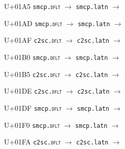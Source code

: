 \documentclass{article}
\begin{document}
\begin{substitutions}
\goodbreak

U+01A5  \linebreak
    \texttt{smcp.\textsc{dflt}} $\to$  \linebreak
    \texttt{smcp.latn} $\to$  

\goodbreak

U+01AD  \linebreak
    \texttt{smcp.\textsc{dflt}} $\to$  \linebreak
    \texttt{smcp.latn} $\to$  

\goodbreak

U+01AF  \linebreak
    \texttt{c2sc.\textsc{dflt}} $\to$  \linebreak
    \texttt{c2sc.latn} $\to$  

\goodbreak

U+01B0  \linebreak
    \texttt{smcp.\textsc{dflt}} $\to$  \linebreak
    \texttt{smcp.latn} $\to$  

\goodbreak

U+01B5  \linebreak
    \texttt{c2sc.\textsc{dflt}} $\to$  \linebreak
    \texttt{c2sc.latn} $\to$  

\goodbreak

U+01DE  \linebreak
    \texttt{c2sc.\textsc{dflt}} $\to$  \linebreak
    \texttt{c2sc.latn} $\to$  

\goodbreak

U+01DF  \linebreak
    \texttt{smcp.\textsc{dflt}} $\to$  \linebreak
    \texttt{smcp.latn} $\to$  

\goodbreak

U+01F0  \linebreak
    \texttt{smcp.\textsc{dflt}} $\to$  \linebreak
    \texttt{smcp.latn} $\to$  

\goodbreak

U+01FA  \linebreak
    \texttt{c2sc.\textsc{dflt}} $\to$  \linebreak
    \texttt{c2sc.latn} $\to$  


\end{substitutions}
\end{document}
